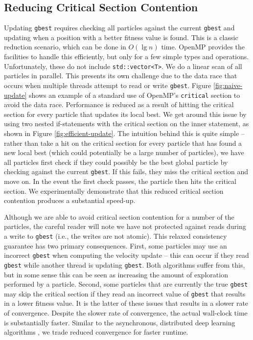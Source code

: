 \subsection{Reducing Critical Section Contention}
Updating \texttt{gbest}
requires checking all particles against the current \texttt{gbest} and updating
when a position with a better fitness value is found. This is a classic
reduction scenario, which can be done in $O(\lg n)$ time. OpenMP provides the
facilities to handle this efficiently, but only for a few simple types and
operations. Unfortunately, these do not include \texttt{std::vector<T>}. We do
a linear scan of all particles in parallel. This presents its
own challenge due to the data race that occurs when multiple threads attempt to
read or write \texttt{gbest}. Figure \ref{fig:naive-update} shows an example of a
standard use of OpenMP's \texttt{critical} section to avoid the data race.
Performance is reduced as a result of hitting the critical section for every
particle that updates its local best. We get around this issue by using two nested if-statements
with the critical section on the inner statement, as shown in Figure
\ref{fig:efficient-update}. The intuition behind this is quite simple -- rather
than take a hit on the critical section for every particle that has found a new
local best (which could potentially be a large number of particles), we
have all particles first check if they could possibly be the best global
particle by checking against the current \texttt{gbest}. If this fails, they
miss the critical section and move on. In the event the first check passes, the
particle then hits the critical section. We experimentally demonstrate that this
reduced critical section contention produces a substantial speed-up.

Although we are able to avoid critical section contention for a number of the
particles, the careful reader will note we have not protected against reads
during a write to \texttt{gbest} (i.e., the writes are not atomic).
This relaxed consistency guarantee has two primary
consequences. First, some particles may use an incorrect \texttt{gbest} when
computing the velocity update -- this can occur if they read \texttt{gbest}
while another thread is updating \texttt{gbest}. Both algorithms suffer from this, but
in some sense this can be seen as increasing the amount of exploration performed by a particle.
Second, some particles that are currently the true \texttt{gbest} may skip the critical section if they read an
incorrect value of \texttt{gbest} that results in a lower fitness value. It is the
latter of these issues that results in a slower rate of convergence. Despite the slower rate of convergence,
the actual wall-clock time is substantially faster. Similar to the asynchronous,
distributed deep learning algorithms \cite{adam, downpour}, we trade reduced convergence for
faster runtime.


